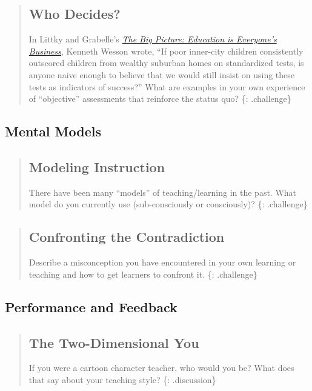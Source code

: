 \begin{quote}
\subsection{Who Decides?}\label{who-decides}

In Littky and Grabelle's
\emph{\href{http://www.amazon.com/Big-Picture-Education-Everyones-Business/dp/0871209713/}{The
Big Picture: Education is Everyone's Business}}, Kenneth Wesson wrote,
``If poor inner-city children consistently outscored children from
wealthy suburban homes on standardized tests, is anyone naive enough to
believe that we would still insist on using these tests as indicators of
success?'' What are examples in your own experience of ``objective''
assessments that reinforce the status quo? \{: .challenge\}
\end{quote}

\subsection{Mental Models}\label{mental-models}

\begin{quote}
\subsection{Modeling Instruction}\label{modeling-instruction}

There have been many ``models'' of teaching/learning in the past. What
model do you currently use (sub-consciously or consciously)? \{:
.challenge\}
\end{quote}

\begin{quote}
\subsection{Confronting the
Contradiction}\label{confronting-the-contradiction}

Describe a misconception you have encountered in your own learning or
teaching and how to get learners to confront it. \{: .challenge\}
\end{quote}

\subsection{Performance and Feedback}\label{performance-and-feedback}

\begin{quote}
\subsection{The Two-Dimensional You}\label{the-two-dimensional-you}

If you were a cartoon character teacher, who would you be? What does
that say about your teaching style? \{: .discussion\}
\end{quote}

